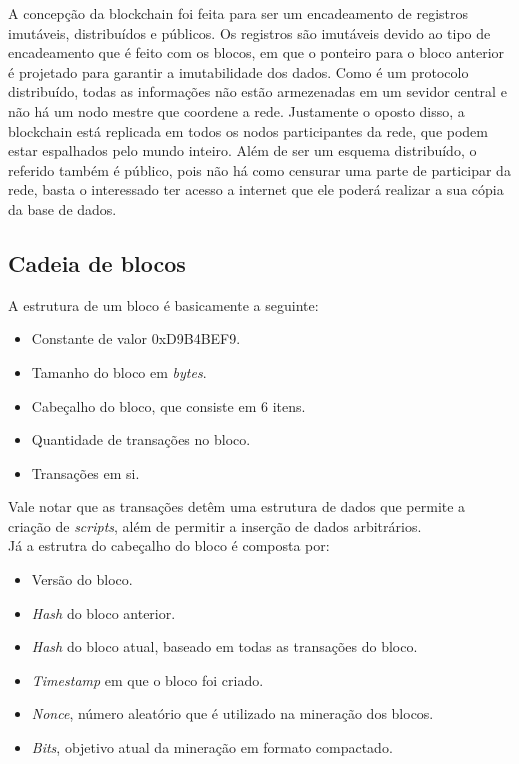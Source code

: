 \documentclass{ufsctex/ufsctex}
\begin{document}
A concepção da blockchain foi feita para ser um encadeamento de registros imutáveis,
distribuídos e públicos. Os registros são imutáveis devido ao tipo de encadeamento
que é feito com os blocos, em que o ponteiro para o bloco anterior é projetado para
garantir a imutabilidade dos dados. Como é um protocolo distribuído, todas as
informações não estão armezenadas em um sevidor central e não há um nodo mestre que
coordene a rede. Justamente o oposto disso, a blockchain está replicada em todos os nodos
participantes da rede, que podem estar espalhados pelo mundo inteiro. Além de ser um
esquema distribuído, o referido também é público, pois não há como censurar uma parte
de participar da rede, basta o interessado ter acesso a internet que ele poderá
realizar a sua cópia da base de dados.\cite{blockchain}

\subsection{Cadeia de blocos}

A estrutura de um bloco é basicamente a seguinte:
\begin{itemize}
	\item Constante de valor 0xD9B4BEF9.
	\item Tamanho do bloco em \textit{bytes}.
	\item Cabeçalho do bloco, que consiste em 6 itens.
	\item Quantidade de transações no bloco.
	\item Transações em si.
\end{itemize}

Vale notar que as transações detêm uma estrutura de dados que permite a criação
de \textit{scripts}, além de permitir a inserção de dados arbitrários. \\

Já a estrutra do cabeçalho do bloco é composta por:
\begin{itemize}
	\item Versão do bloco.
	\item \textit{Hash} do bloco anterior.
	\item \textit{Hash} do bloco atual, baseado em todas as transações do bloco.
	\item \textit{Timestamp} em que o bloco foi criado.
	\item \textit{Nonce}, número aleatório que é utilizado na mineração dos blocos.
	\item \textit{Bits}, objetivo atual da mineração em formato compactado.
\end{itemize}
\end{document}
